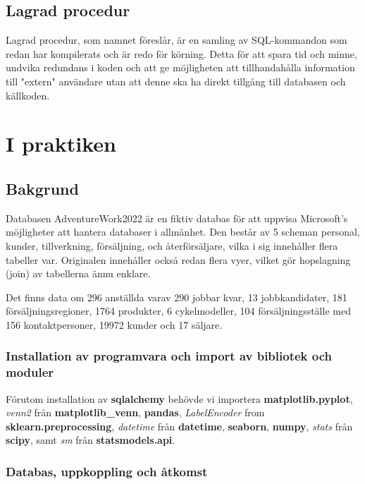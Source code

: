 \documentclass[]{article}
\begin{document}
\subsection{Lagrad procedur}

Lagrad procedur, som namnet föreslår, är en samling av SQL-kommandon som redan har kompilerats och är redo för körning. Detta för att spara tid och minne, undvika redundans i koden och att ge möjligheten att tillhandahålla information till "extern" användare utan att denne ska ha direkt tillgång till databasen och källkoden.



\section{I praktiken}


\subsection{Bakgrund}

Databasen AdventureWork2022 är en fiktiv databas för att uppvisa Microsoft's möjligheter att hantera databaser i allmänhet. Den består av 5 scheman personal, kunder, tillverkning, försäljning, och återförsäljare, vilka i sig innehåller flera tabeller var. Originalen innehåller också redan flera vyer, vilket gör hopslagning (join) av tabellerna ännu enklare.

Det finns data om 296 anställda varav 290 jobbar kvar, 13 jobbkandidater, 181 försäljningsregioner, 1764 produkter, 6 cykelmodeller, 104 försäljningsställe med 156 kontaktpersoner, 19972 kunder och 17 säljare.

\subsubsection{Installation av programvara och import av bibliotek och moduler}

Förutom installation av \textbf{sqlalchemy} behövde vi importera \textbf{matplotlib.pyplot}, \emph{venn2} från \textbf{matplotlib\_venn}, \textbf{pandas}, \emph{LabelEncoder} from \textbf{sklearn.preprocessing}, \emph{datetime} från \textbf{datetime}, \textbf{seaborn}, \textbf{numpy}, \emph{stats} från \textbf{scipy}, samt \emph{sm} från \textbf{statsmodels.api}.

\subsubsection{Databas, uppkoppling och åtkomst}
\end{document}
